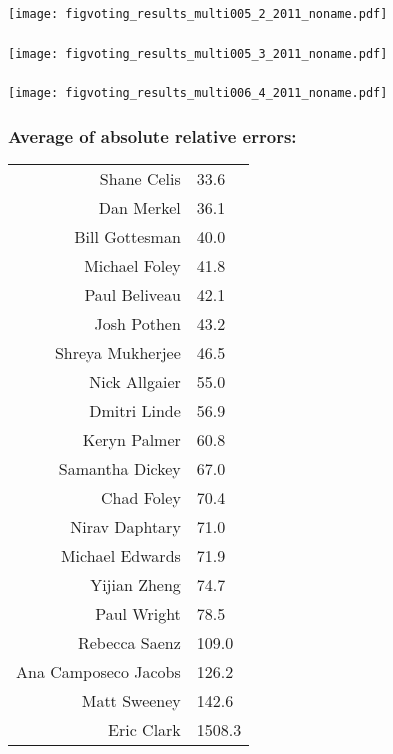 \begin{frame}[plain]
  \frametitle{}

  \texttt{[image: figvoting\_results\_multi005\_2\_2011\_noname.pdf]}

\end{frame}

\begin{frame}[plain]
  \frametitle{}

  \texttt{[image: figvoting\_results\_multi005\_3\_2011\_noname.pdf]}

\end{frame}

\begin{frame}[plain]
  \frametitle{}

  \texttt{[image: figvoting\_results\_multi006\_4\_2011\_noname.pdf]}

\end{frame}



\begin{frame}
  \small
  \frametitle{Average of absolute relative errors:}

  \begin{tabular}{rl}
    Shane Celis & 33.6 \\ 
    Dan Merkel & 36.1 \\ 
    Bill Gottesman & 40.0 \\ 
    Michael Foley & 41.8 \\ 
    Paul Beliveau & 42.1 \\ 
    Josh Pothen & 43.2 \\ 
    Shreya Mukherjee & 46.5 \\ 
    Nick Allgaier & 55.0 \\ 
    Dmitri Linde & 56.9 \\ 
    Keryn Palmer & 60.8 \\ 
    Samantha Dickey & 67.0 \\ 
    Chad Foley & 70.4 \\ 
    Nirav Daphtary & 71.0 \\ 
    Michael Edwards & 71.9 \\ 
    Yijian Zheng & 74.7 \\ 
    Paul Wright & 78.5 \\ 
    Rebecca Saenz & 109.0 \\ 
    Ana Camposeco Jacobs & 126.2 \\ 
    Matt Sweeney & 142.6 \\ 
    Eric Clark & 1508.3 \\ 
  \end{tabular}
  
\end{frame}

